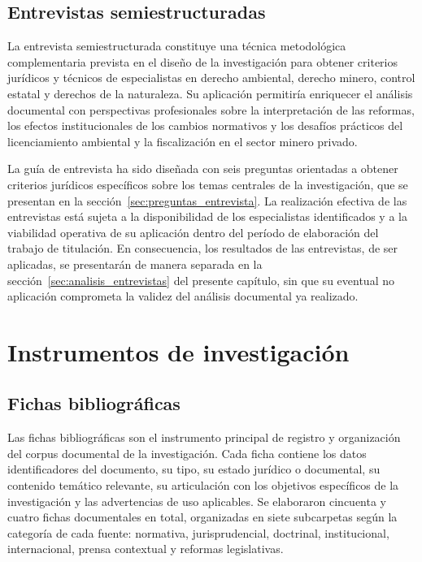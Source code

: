 \subsection{Entrevistas semiestructuradas}

La entrevista semiestructurada constituye una técnica metodológica complementaria prevista en el diseño de la investigación para obtener criterios jurídicos y técnicos de especialistas en derecho ambiental, derecho minero, control estatal y derechos de la naturaleza. Su aplicación permitiría enriquecer el análisis documental con perspectivas profesionales sobre la interpretación de las reformas, los efectos institucionales de los cambios normativos y los desafíos prácticos del licenciamiento ambiental y la fiscalización en el sector minero privado.

La guía de entrevista ha sido diseñada con seis preguntas orientadas a obtener criterios jurídicos específicos sobre los temas centrales de la investigación, que se presentan en la sección~\ref{sec:preguntas_entrevista}. La realización efectiva de las entrevistas está sujeta a la disponibilidad de los especialistas identificados y a la viabilidad operativa de su aplicación dentro del período de elaboración del trabajo de titulación. En consecuencia, los resultados de las entrevistas, de ser aplicadas, se presentarán de manera separada en la sección~\ref{sec:analisis_entrevistas} del presente capítulo, sin que su eventual no aplicación comprometa la validez del análisis documental ya realizado.

\section{Instrumentos de investigación}

\subsection{Fichas bibliográficas}

Las fichas bibliográficas son el instrumento principal de registro y organización del corpus documental de la investigación. Cada ficha contiene los datos identificadores del documento, su tipo, su estado jurídico o documental, su contenido temático relevante, su articulación con los objetivos específicos de la investigación y las advertencias de uso aplicables. Se elaboraron cincuenta y cuatro fichas documentales en total, organizadas en siete subcarpetas según la categoría de cada fuente: normativa, jurisprudencial, doctrinal, institucional, internacional, prensa contextual y reformas legislativas.

